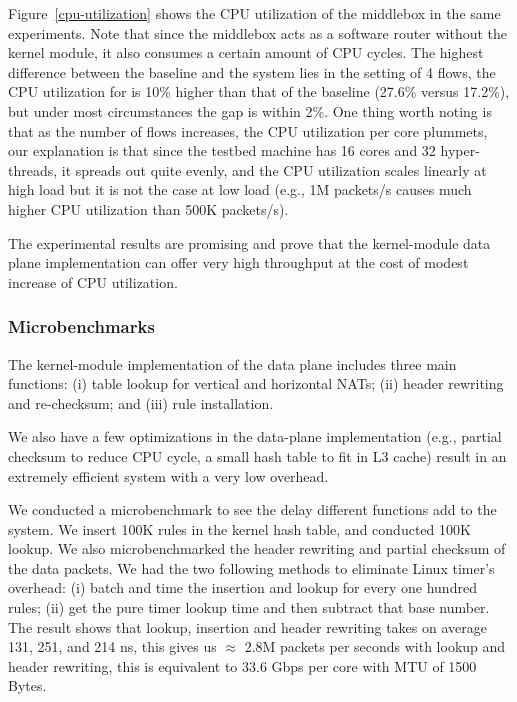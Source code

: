 Figure~\ref{cpu-utilization}   shows  the    CPU  utilization  of  the
middlebox in the same experiments.  Note that since the middlebox acts
as a software  router without the  kernel module,  it also consumes  a
certain  amount  of CPU  cycles.   The highest difference between  the
baseline and the system  lies  in the setting  of   4 flows,  the  CPU
utilization  for \system  is 10\%   higher than that  of the  baseline
(27.6\% versus 17.2\%), but under most circumstances the gap is within
2\%. One thing worth noting is that  as the number of flows increases,
the  CPU utilization per core  plummets, our explanation is that since
the testbed machine has 16 cores and 32  hyper-threads, it spreads out
quite evenly, and the CPU utilization scales linearly at high load but
it is not the case at low load  (e.g., 1M packets/s causes much higher
CPU utilization than 500K packets/s).

The  experimental   results    are  promising   and   prove  that  the
kernel-module data plane implementation can offer very high throughput
at the cost of modest increase of CPU utilization.


\subsubsection{Microbenchmarks}

The kernel-module implementation of the data plane includes three main
functions:  (i) table lookup for   vertical and horizontal NATs;  (ii)
header rewriting and re-checksum; and (iii) rule installation.

We also
have  a  few  optimizations in  the  data-plane  implementation (e.g.,
partial checksum to reduce CPU cycle, a small hash  table to fit in L3
cache)    result in an extremely  efficient   system with   a very low
overhead.

We conducted a microbenchmark to see the delay different functions add
to the  system. We insert 100K  rules  in the  kernel  hash table, and
conducted 100K  lookup. We also  microbenchmarked the header rewriting
and partial checksum of  the data packets.   We had the  two following
methods to  eliminate Linux timer's  overhead: (i) batch  and time the
insertion  and lookup for every one  hundred rules; (ii)  get the pure
timer lookup time and then subtract that base number. The result shows
that lookup, insertion and header rewriting takes on average 131, 251,
and 214 ns, this  gives us $\approx  $  2.8M packets per seconds  with
lookup and header rewriting, this is  equivalent to 33.6 Gbps per core
with MTU of 1500 Bytes.

